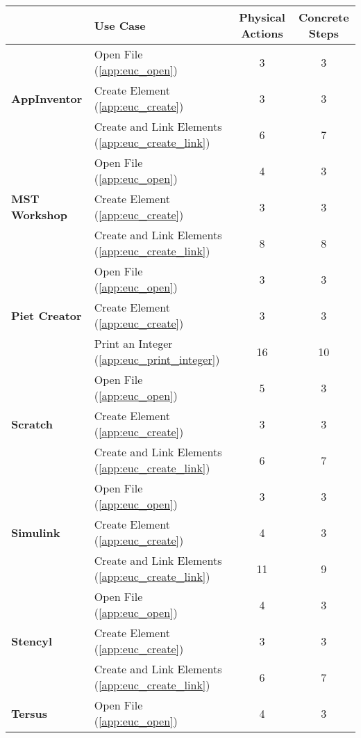 \begin{table*}[!htb]\centering
{}
\begin{tabularx}{\textwidth}{lXcc}\toprule
 & \textbf{Use Case} & \textbf{Physical Actions} & \textbf{Concrete Steps}\\
\midrule
\multirow{3}{*}{\textbf{AppInventor}}
& Open File (\ref{app:euc_open})                       & 3 & 3 \\
& Create Element (\ref{app:euc_create})                & 3 & 3 \\
& Create and Link Elements (\ref{app:euc_create_link}) & 6 & 7 \\
\midrule
\multirow{3}{*}{\textbf{MST Workshop}}
& Open File (\ref{app:euc_open})                       & 4 & 3 \\
& Create Element (\ref{app:euc_create})                & 3 & 3 \\
& Create and Link Elements (\ref{app:euc_create_link}) & 8 & 8 \\
\midrule
\multirow{3}{*}{\textbf{Piet Creator}}
& Open File (\ref{app:euc_open})                       & 3 & 3 \\
& Create Element (\ref{app:euc_create})                & 3 & 3 \\
& Print an Integer (\ref{app:euc_print_integer})       & 16 & 10 \\
\midrule
\multirow{3}{*}{\textbf{Scratch}}
& Open File (\ref{app:euc_open})                       & 5 & 3 \\
& Create Element (\ref{app:euc_create})                & 3 & 3 \\
& Create and Link Elements (\ref{app:euc_create_link})          & 6 & 7 \\
\midrule
\multirow{3}{*}{\textbf{Simulink}}
& Open File (\ref{app:euc_open})                       & 3  & 3 \\
& Create Element (\ref{app:euc_create})                & 4  & 3 \\
& Create and Link Elements (\ref{app:euc_create_link})          & 11 & 9 \\
\midrule
\multirow{3}{*}{\textbf{Stencyl}}
& Open File (\ref{app:euc_open})                       & 4 & 3 \\
& Create Element (\ref{app:euc_create})                & 3 & 3 \\
& Create and Link Elements (\ref{app:euc_create_link}) & 6 & 7 \\
\midrule
\multirow{3}{*}{\textbf{Tersus}}
& Open File (\ref{app:euc_open})                       & 4 & 3 \\

\end{tabularx}
\end{table*}
